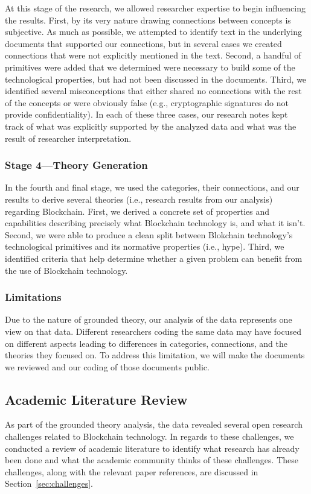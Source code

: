 At this stage of the research, we allowed researcher expertise to begin influencing the results.
First, by its very nature drawing connections between concepts is subjective.
As much as possible, we attempted to identify text in the underlying documents that supported our connections, but in several cases we created connections that were not explicitly mentioned in the text.
Second, a handful of primitives were added that we determined were necessary to build some of the technological properties, but had not been discussed in the documents.
Third, we identified several misconceptions that either shared no connections with the rest of the concepts or were obviously false (e.g., cryptographic signatures do not provide confidentiality).
In each of these three cases, our research notes kept track of what was explicitly supported by the analyzed data and what was the result of researcher interpretation.

\subsubsection{Stage 4---Theory Generation}
In the fourth and final stage, we used the categories, their connections, and our results to derive several theories (i.e., research results from our analysis) regarding Blockchain.
First, we derived a concrete set of properties and capabilities describing precisely what Blockchain technology is, and what it isn't.
Second, we were able to produce a clean split between Blokchain technology's technological primitives and its normative properties (i.e., hype).
Third, we identified criteria that help determine whether a given problem can benefit from the use of Blockchain technology.

\subsubsection{Limitations}
Due to the nature of grounded theory, our analysis of the data represents one view on that data.
Different researchers coding the same data may have focused on different aspects leading to differences in categories, connections, and the theories they focused on.
To address this limitation, we will make the documents we reviewed and our coding of those documents public.

\subsection{Academic Literature Review}
As part of the grounded theory analysis, the data revealed several open research challenges related to Blockchain technology.
In regards to these challenges, we conducted a review of academic literature to identify what research has already been done and what the academic community thinks of these challenges.
These challenges, along with the relevant paper references, are discussed in Section~\ref{sec:challenges}.